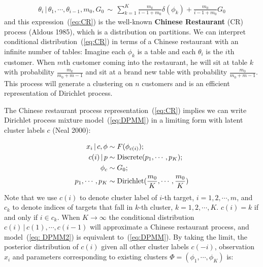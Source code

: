 \documentclass[12pt]{article}
\begin{document}
\begin{eqnarray}
\label{eq:CR}
    \theta_i\,|\, \theta_1,\cdots,\theta_{i-1},m_0,G_0 \, \sim\, \sum_{k=1}^{K}\frac{m_k}{i-1+m_0}\delta(\phi_k) + \frac{m_0}{i-1+m_0}G_0
\end{eqnarray}
and this expression~(\ref{eq:CR}) is the well-known \textbf{Chinese Restaurant} (CR) process (Aldous 1985), which is a distribution on partitions. We can interpret conditional distribution~(\ref{eq:CR}) in terms of a Chinese restaurant with an infinite number of tables: Imagine each $\phi_k$ is a table and each $\theta_i$ is the $i$th customer. When $m$th customer coming into the restaurant, he will sit at table $k$ with probability $\frac{m_k}{m_0+m-1}$ and sit at a brand new table with probability $\frac{m_0}{m_0+m-1}$. This process will generate a clustering on $n$ customers and is an efficient representation of Dirichlet process. 

The Chinese restaurant process representation~(\ref{eq:CR}) implies we can write Dirichlet process mixture model~(\ref{eq:DPMM}) in a limiting form with latent cluster labels $c$ (Neal 2000):

\begin{align}
\label{eq: DPMM2}
\begin{split}
    x_i\,|\,c,\phi &\sim F(\phi_{c(i)});\\
    c(i)\,|\,p &\sim {\rm Discrete}(p_1,\cdots,p_K);\\
    \phi_c &\sim G_0;\\
    p_1,\cdots,p_K &\sim {\rm Dirichlet}(\frac{m_0}{K},\cdots,\frac{m_0}{K})
\end{split}
\end{align}
Note that we use $c(i)$ to denote cluster label of $i$-th target, $i = 1,2,\cdots,m$, and $c_k$ to denote indices of targets that fall in $k$-th cluster, $k=1,2,\cdots,K$. $c(i) = k$ if and only if $i \in c_k$. When $K\to \infty$ the conditional distribution $c(i)\,|\,c(1),\cdots,c(i-1)$ will approximate a Chinese restaurant process, and model~(\ref{eq: DPMM2}) is equivalent to~(\ref{eq:DPMM}). By taking the limit, the posterior distribution of $c(i)$ given all other cluster labels $c(-i)$, observation $x_i$ and parameters corresponding to existing clusters $\Phi = (\phi_1,\cdots,\phi_K)$ is:
\end{document}
